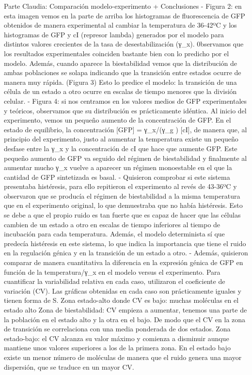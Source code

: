 Parte Claudia: Comparación modelo-experimento + Conclusiones
- Figura 2: en esta imagen vemos en la parte de arriba los histogramas de fluorescencia de GFP obtenidos de manera experimental al cambiar la temperatura de 36-42ºC y los histogramas de GFP y cI (represor lambda) generados por el modelo para distintos valores crecientes de la tasa de desestabilización (γ_x). 0bservamos que los resultados experimentales coinciden bastante bien con lo predicho por el modelo. Además, cuando aparece la biestabilidad vemos que la distribución de ambas poblaciones se solapa indicando que la transición entre estados ocurre de manera muy rápida. (Figura 3) Esto lo predice el modelo: la transición de una célula de un estado a otro ocurre en escalas de tiempo menores que la división celular.
- Figura 4: si nos centramos en los valores medios de GFP experimentales y teóricos, observamos que su distribución es prácticamente idéntica. Al inicio del experimento, vemos un pequeño aumento de la concentración de GFP. En el estado de equilibrio, la concentración [GFP] =  γ_x/(γ_g  ) [cI], de manera que, al principio del experimento, justo al aumentar la temperatura existe un pequeño desfase entre la γ_x y la concentración de cI que hace que aumente GFP. Este pequeño aumento de GFP va seguido del régimen de biestabilidad y finalmente al aumentar mucho  γ_x vuelve a aparecer un régimen monoestable en el que la cantidad de GFP sintetizada es basal.
- Quisieron comprobar si este sistema presentaba histéresis, para ello repitieron el experimento al revés de 43-36ºC y observaron que se producía el régimen de biestabilidad a la misma temperatura que en el experimento original, lo que demuestraba que no había histéresis. Esto se debe a que el propio ruido es tan fuerte que es capaz de hacer que las células cambien de un estado a otro en escalas de tiempo inferiores al tiempo de incubación para cada temperatura. Además, el modelo determinista sí que predecía histéresis en este sistema, lo que indica la importancia que tiene el ruido en la regulación génica y en la transición de un estado a otro.
- Además, quisieron comparar de manera cuantitativa la diferencia en la expresión génica de GFP en función de la temperatura/γ_x  en el modelo versus el experimento. Para cuantificar la variabilidad relativa en cada caso, utilizaron el coeficiente de variación (CV). Las gráficas obtenidas en cada caso son prácticamente iguales y tienen forma de S. 
	Zona estado-alto donde CV es bajo: muchas moléculas en el estado alto 
	Zona de biestabilidad: CV empieza a aumentar, tenemos una parte de la población en el estado alto y la otra en el bajo. De modo que el CV en la zona de transición se correlaciona con una media ponderada de dos estados.
	Zona estado-bajo: el CV alcanza su valor máximo y comienza a disminuir aunque mantiene unos valores superiores a los de la primera zona. En el estado bajo existe un menor número de moléculas de manera que el ruido genera una mayor dispersión, que se traduce en un mayor CV.
	
